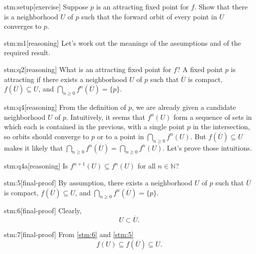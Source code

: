 \documentclass{article}
\begin{document}

\begin{stm}{stm:setup}[exercise]
Suppose $p$ is an attracting fixed point for $f$. Show that there is a neighborhood $U$ of $p$ such that the forward orbit of every point in $U$ converges to $p$.
\end{stm}


\begin{stm}{stm:m1}[reasoning]
Let's work out the meanings of the assumptions and of the required result.
\end{stm}

\begin{stm}{stm:q2}[reasoning]
What is an attracting fixed point for $f$? A fixed point $p$ is attracting if there exists a neighborhood $U$ of $p$ such that $\overline{U}$ is compact, $f(\overline{U}) \subseteq U$, and $\bigcap_{n \ge 0} f^n(\overline{U}) = \{p\}$.
\end{stm}

\begin{stm}{stm:q4}[reasoning]
From the definition of $p$, we are already given a candidate neighborhood $U$ of $p$. Intuitively, it seems that $f^n(U)$ form a sequence of sets in which each is contained in the previous, with a single point $p$ in the intersection, so orbits should converge to $p$ or to a point in $\bigcap_{n \ge 0} f^n(U)$. But $f(\overline{U}) \subseteq U$ makes it likely that $\bigcap_{n \ge 0} f^n(\overline{U}) = \bigcap_{n \ge 0} f^n(U)$. Let's prove those intuitions.
\end{stm}

\begin{stm}{stm:q4a}[reasoning]
Is $f^{n+1}(U) \subseteq f^n(U)$ for all $n \in \mathbb{N}$?
\end{stm}

\begin{stm}{stm:5}[final-proof]
By assumption, there exists a neighborhood $U$ of $p$ such that $\overline{U}$ is compact, $f(\overline{U}) \subseteq U$, and $\bigcap_{n \ge 0} f^n(\overline{U}) = \{p\}$.
\end{stm}


\begin{stm}{stm:6}[final-proof]
Clearly,
$$U \subset \overline{U}.$$
\end{stm}

\begin{stm}{stm:7}[final-proof]
From \ref{stm:6} and \ref{stm:5}
$$f(U) \subseteq f(\overline{U}) \subseteq U.$$
\end{stm}
\end{document}
